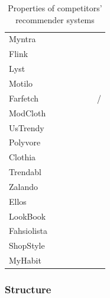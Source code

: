 \documentclass{beamer}
\newcommand{\cmark}{\color{ForestGreen}\ding{52}} %
\newcommand{\xmark}{\color{RedOrange}\ding{55}}   %
\begin{document}
\begin{frame}
\begin{table}[H]
{\begin{tabular}{lllllll}
                Myntra  & \cmark & \cmark & \cmark & \cmark & \xmark & \xmark \\
                Flink   & \xmark & \cmark & \cmark & \cmark & \cmark & \xmark \\
                Lyst    & \xmark & \cmark & \cmark & \cmark & \cmark & \xmark \\
                Motilo  & \xmark & \cmark & \xmark & \cmark & \cmark & \xmark \\
                Farfetch & \cmark & \cmark & \cmark & \cmark & \xmark & \xmark/\cmark \\
                ModCloth  & \cmark & \cmark & \cmark & \cmark & \xmark & \xmark \\
                UsTrendy  & \cmark & \cmark & \cmark & \cmark & \xmark & \xmark \\
                Polyvore  & \xmark & \cmark & \cmark & \cmark & \cmark & \xmark \\
                Clothia  & \xmark & \cmark & \cmark & \cmark & \cmark & \xmark \\
                Trendabl  & \cmark & \cmark & \cmark & \cmark & \cmark & \xmark \\
                Zalando  & \cmark & \cmark & \cmark & \cmark & \xmark & \xmark \\
                Ellos  & \cmark & \cmark & \cmark & \cmark & \xmark & \xmark \\
                LookBook  & \xmark & \cmark & \cmark & \cmark & \cmark & \xmark \\
                Fahsiolista  & \xmark & \cmark & \xmark & \cmark & \cmark & \xmark \\
                ShopStyle  & \xmark & \xmark & \cmark & \cmark & \xmark & \xmark \\
                MyHabit  & \cmark & \xmark & \cmark & \xmark & \xmark & \xmark \\
                \bottomrule
            \end{tabular}
          }
          \caption{Properties of competitors' recommender systems}
      \end{table}
  \end{frame}

  \begin{frame}
    \frametitle{Structure}
    \tableofcontents
  \end{frame}

\end{document}
